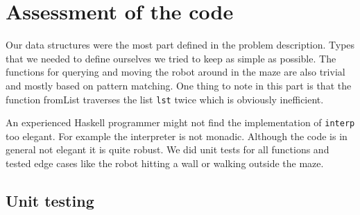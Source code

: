 \documentclass[a4paper,10pt]{article}
\begin{document}
\section{Assessment of the code}

Our data structures were the most part defined in the problem description. Types that we needed to define ourselves we tried to keep as simple as possible. The functions for querying and moving the robot around in the maze are also trivial and mostly based on pattern matching. One thing to note in this part is that the function fromList traverses the list \verb=lst= twice which is obviously inefficient.

An experienced Haskell programmer might not find the implementation of \verb=interp= too elegant. For example the interpreter is not monadic. Although the code is in general not elegant it is quite robust. We did unit tests for all functions and tested edge cases like the robot hitting a wall or walking outside the maze.

\subsection{Unit testing}
\end{document}

